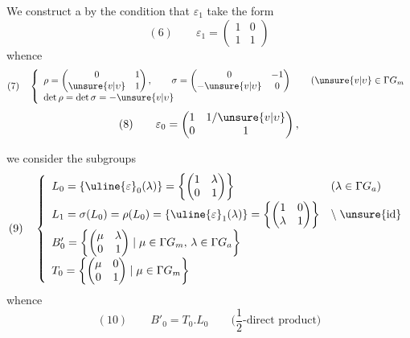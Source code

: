 We construct a 
by the condition that $\varepsilon_1$ take the form
\[
(6)\qquad\varepsilon_1
 =\begin{pmatrix}1&0\\1&1\end{pmatrix}
\]
whence
\[
(7)\quad\left\{\begin{array}{l}
\displaystyle\rho=\begin{pmatrix}0&1\\\unsure{v|\upsilon}&1\end{pmatrix},\qquad
 \sigma=\begin{pmatrix}0&-1\\-\unsure{v|\upsilon}&0\end{pmatrix}
 \qquad(\unsure{v|\upsilon}\in\Gamma G_m\\[6pt]
\det\rho=\det\sigma=-\unsure{v|\upsilon}
\end{array}\right.
\]
\[
(8)\qquad\varepsilon_0
 =\begin{pmatrix}1&1/\unsure{v|\upsilon}\\0&1\end{pmatrix},
\]



we consider the subgroups
\[
(9)\quad\left\{\begin{array}{ll}
 L_0=\{\uline{\varepsilon}_0(\lambda)\}
   =\left\{\begin{pmatrix}1&\lambda\\0&1\end{pmatrix}\right\}
 & (\lambda\in\Gamma G_a)\\[7pt]
 L_1=\sigma(L_0)=\rho(L_0)
   =\{\uline{\varepsilon}_1(\lambda)\}
   =\left\{\begin{pmatrix}1&0\\\lambda&1\end{pmatrix}\right\}
 & \backslash\;\unsure{\text{id}}\\[7pt]
 B'_0=\left\{\begin{pmatrix}\mu&\lambda\\0&1\end{pmatrix}
       \mid\mu\in\Gamma G_m,\,\lambda\in\Gamma G_a\right\} &\\[7pt]
 T_0=\left\{\begin{pmatrix}\mu&0\\0&1\end{pmatrix}
       \mid\mu\in\Gamma G_m\right\} &
\end{array}\right.
\]
whence
\[
(10)\qquad B'_0=T_0.L_0\qquad\text{($\frac12$-direct product)}
\]
\margin{\unsure{---}}

